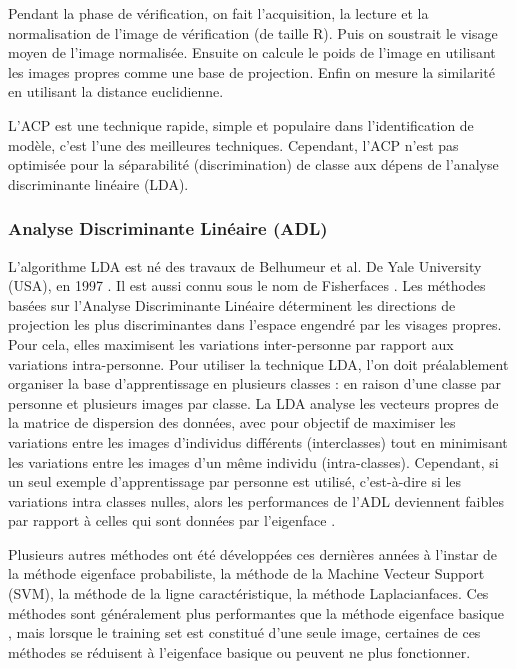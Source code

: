 Pendant la phase de vérification, on fait l'acquisition, la lecture et la normalisation de l'image de vérification (de taille R). Puis on soustrait le visage moyen de l'image normalisée. Ensuite on calcule le poids de l'image en utilisant les images propres comme une base de projection. Enfin on mesure la similarité en utilisant la distance euclidienne. %

L'ACP est une technique rapide, simple et populaire dans l'identification de modèle, c'est l'une des meilleures techniques. Cependant, l'ACP n'est pas optimisée pour la séparabilité (discrimination) de classe aux dépens de l'analyse discriminante linéaire (LDA). 

\subsubsection{Analyse Discriminante Linéaire (ADL)}

L'algorithme LDA est né des travaux de Belhumeur et al. De Yale University (USA), en  1997 \citep{BEL}. Il est aussi connu sous le nom de \og Fisherfaces \fg{}. Les méthodes basées sur l'Analyse Discriminante Linéaire  déterminent les directions de projection les plus discriminantes dans l'espace engendré par les visages propres. Pour cela, elles maximisent les variations inter-personne par rapport aux variations intra-personne. Pour utiliser la technique LDA, l'on doit préalablement organiser la base d'apprentissage en plusieurs classes : en raison d'une classe par personne et plusieurs images par classe.  La LDA analyse les vecteurs propres de la matrice de dispersion des données, avec pour  objectif de maximiser les variations entre les 
images d'individus différents (interclasses) tout  en minimisant les variations entre les images d'un même individu (intra-classes). Cependant, si un seul exemple d'apprentissage par personne est utilisé, c'est-à-dire
si les variations intra classes nulles, alors les performances de l'ADL deviennent faibles par rapport à celles  qui sont données par l'eigenface \cite{MAR}.

Plusieurs autres méthodes ont été développées ces dernières années à l'instar de la méthode eigenface probabiliste, la méthode de la Machine Vecteur Support (SVM), la méthode de la ligne caractéristique, la méthode Laplacianfaces. Ces méthodes sont généralement plus performantes que la méthode eigenface basique \cite{Sou12}, mais lorsque le training set est constitué d'une seule image, certaines de ces méthodes se réduisent à l'eigenface basique ou peuvent ne plus fonctionner.

